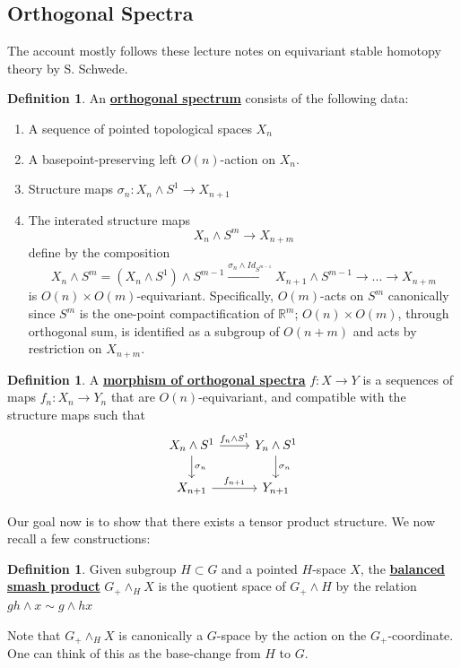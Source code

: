 \documentclass{article}
\theoremstyle{definition}
\newtheorem{definition}[theorem]{Definition}
\begin{document}
\subsection{Orthogonal Spectra}
The account mostly follows these lecture notes \cite{Schwede} on equivariant stable homotopy theory by S. Schwede. 
\begin{tcolorbox}[colback=purple!5!white,colframe=purple!75!black]
\begin{definition}
An \underline{\textbf{orthogonal spectrum}} consists of the following data:
\begin{enumerate}
    \item A sequence of pointed topological spaces $X_n$
    \item A basepoint-preserving left $O(n)$-action on $X_n$.
    \item Structure maps $\sigma_n:X_n\wedge S^1\to X_{n+1}$
    \item The interated structure maps
    \[X_n\wedge S^m\to X_{n+m}\]
    define by the composition 
    \[X_{n}\wedge S^m=(X_n\wedge S^1)\wedge S^{m-1}\xrightarrow{\sigma_n\wedge Id_{S^{m-1}}}X_{n+1}\wedge S^{m-1}\to...\to X_{n+m}\]
    is $O(n)\times O(m)$-equivariant. Specifically, $O(m)$-acts on $S^m$ canonically since $S^m$ is the one-point compactification of $\mathbb{R}^m$; $O(n)\times O(m)$, through orthogonal sum, is identified as a subgroup of $O(n+m)$ and acts by restriction on $X_{n+m}$.
\end{enumerate}
\end{definition}
\end{tcolorbox}


\begin{tcolorbox}[colback=purple!5!white,colframe=purple!75!black]
\begin{definition}
A \underline{\textbf{morphism of orthogonal spectra}} $f: X\to Y$ is a sequences of maps $f_n: X_n\to Y_n$ that are $O(n)$-equivariant, and compatible with the structure maps such that 
\[\begin{tikzcd}
X_n \wedge S^1 \arrow[r,"f_n\wedge S^1"]\arrow[d,"\sigma_n"]& Y_n\wedge S^1\arrow[d,"\sigma_n"]\\
X_{n+1}\arrow[r,"f_{n+1}"]& Y_{n+1}
\end{tikzcd}\]
\end{definition}
\end{tcolorbox}
Our goal now is to show that there exists a tensor product structure. We now recall a few constructions: 

\begin{tcolorbox}[colback=purple!5!white,colframe=purple!75!black]
\begin{definition}
Given subgroup $H\subset G$ and a pointed $H$-space $X$, the \underline{\textbf{balanced smash product}} $G_+\wedge_{H} X$ is the quotient space of $G_+\wedge H$ by the relation $gh\wedge x\sim g\wedge hx$
\end{definition}
\end{tcolorbox}
Note that $G_+\wedge_{H} X$ is canonically a $G$-space by the action on the $G_+$-coordinate. One can think of this as the base-change from $H$ to $G$. 
\end{document}
